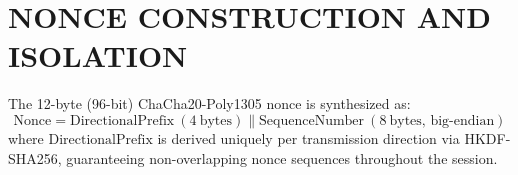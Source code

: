 \section{NONCE CONSTRUCTION AND ISOLATION}
The 12-byte (96-bit) ChaCha20-Poly1305 nonce is synthesized as:
\begin{equation}
    \text{Nonce} = \text{DirectionalPrefix}\ (4\ \text{bytes}) \parallel \text{SequenceNumber}\ (8\ \text{bytes, big-endian})
\end{equation}
where $\text{DirectionalPrefix}$ is derived uniquely per transmission direction via HKDF-SHA256, guaranteeing non-overlapping nonce sequences throughout the session.
